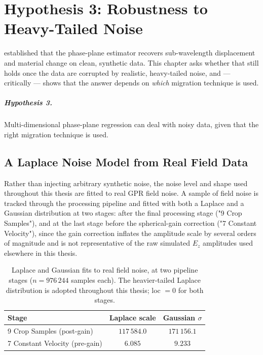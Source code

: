\chapter{Hypothesis 3: Robustness to Heavy-Tailed Noise}
\label{ch:hyp3}

 established that the phase-plane estimator recovers
sub-wavelength displacement and material change on clean, synthetic data.
This chapter asks whether that still holds once the data are corrupted by
realistic, heavy-tailed noise, and --- critically --- shows that the answer
depends on \emph{which} migration technique is used.

\paragraph{Hypothesis 3.} Multi-dimensional phase-plane regression can deal
with noisy data, given that the right migration technique is used.

\section{A Laplace Noise Model from Real Field Data}
\label{sec:hyp3-laplace}

Rather than injecting arbitrary synthetic noise, the noise level and shape
used throughout this thesis are fitted to real GPR field noise. A sample of
field noise is tracked through the processing pipeline and fitted with both
a Laplace and a Gaussian distribution at two stages: after the final
processing stage ("9 Crop Samples"), and at the last stage before the
spherical-gain correction ("7 Constant Velocity"), since the gain correction
inflates the amplitude scale by several orders of magnitude and is not
representative of the raw simulated $E_z$ amplitudes used elsewhere in this
thesis.

\begin{table}[htbp]
  \centering
  \caption{Laplace and Gaussian fits to real field noise, at two pipeline
    stages ($n=976\,244$ samples each). The heavier-tailed Laplace
    distribution is adopted throughout this thesis; loc $=0$ for both
    stages.}
  \label{tab:laplace-fit}
  \begin{tabular}{lcc}
    \toprule
    Stage & Laplace scale & Gaussian $\sigma$ \\
    \midrule
    9 Crop Samples (post-gain)        & $117\,584.0$ & $171\,156.1$ \\
    7 Constant Velocity (pre-gain)    & $6.085$      & $9.233$ \\
    \bottomrule
  \end{tabular}
\end{table}

